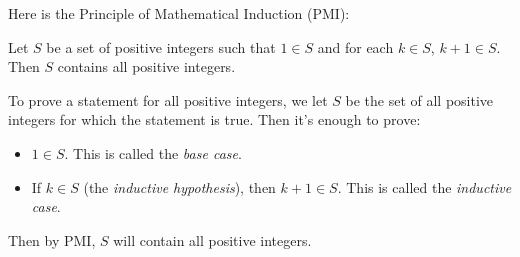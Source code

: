Here is the Principle of Mathematical Induction (PMI):
\begin{tcolorbox}
  Let $S$ be a set of positive integers such that $1\in S$ and for each $k\in S$,
  $k+1\in S$. Then $S$ contains all positive integers.
\end{tcolorbox}

To prove a statement for all positive integers, we let $S$ be the set of all
positive integers for which the statement is true. Then it's enough to prove:
\begin{itemize}
  \item $1\in S$. This is called the \emph{base case}.
  \item If $k\in S$ (the \emph{inductive hypothesis}), then $k+1\in S$. This is
    called the \emph{inductive case}.
\end{itemize}
Then by PMI, $S$ will contain all positive integers.


